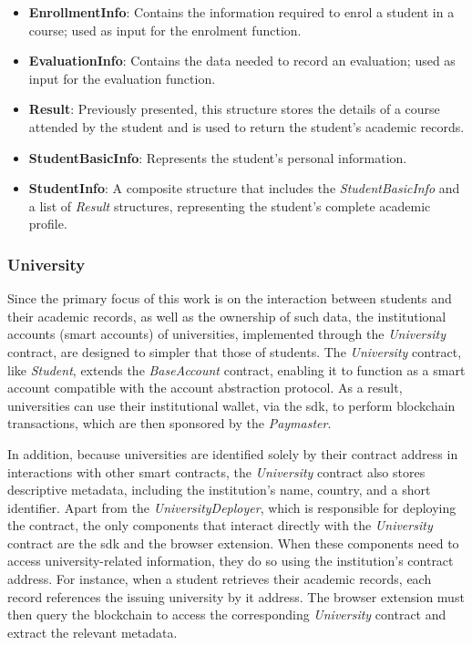 \begin{itemize}
    \item \textbf{EnrollmentInfo}: Contains the information required to enrol a student in a course; used as input for the enrolment function.
    \item \textbf{EvaluationInfo}: Contains the data needed to record an evaluation; used as input for the evaluation function.
    \item \textbf{Result}: Previously presented, this structure stores the details of a course attended by the student and is used to return the student's academic records.
    \item \textbf{StudentBasicInfo}: Represents the student's personal information.
    \item \textbf{StudentInfo}: A composite structure that includes the \textit{StudentBasicInfo} and a list of \textit{Result} structures, representing the student’s complete academic profile.
\end{itemize}

\subsubsection{University}
Since the primary focus of this work is on the interaction between students and their academic records, as well as the ownership of such data, the institutional accounts (smart accounts) of universities, implemented through the \textit{University} contract, are designed to simpler that those of students. The \textit{University} contract, like \textit{Student}, extends the \textit{BaseAccount} contract, enabling it to function as a smart account compatible with the account abstraction protocol. As a result, universities can use their institutional wallet, via the \acrshort{sdk}, to perform blockchain transactions, which are then sponsored by the \textit{Paymaster}. 

In addition, because universities are identified solely by their contract address in interactions with other smart contracts, the \textit{University} contract also stores descriptive metadata, including the institution's name, country, and a short identifier. Apart from the \textit{UniversityDeployer}, which is responsible for deploying the contract, the only components that interact directly with the \textit{University} contract are the \acrshort{sdk} and the browser extension. When these components need to access university-related information, they do so using the institution's contract address. For instance, when a student retrieves their academic records, each record references the issuing university by it address. The browser extension must then query the blockchain to access the corresponding \textit{University} contract and extract the relevant metadata.    

